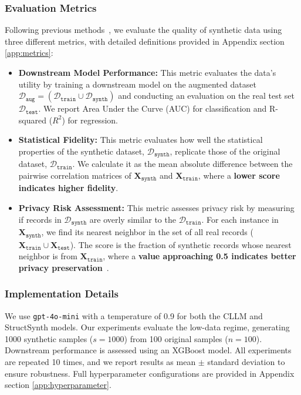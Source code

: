 \subsubsection{Evaluation Metrics}
Following previous methods~\cite{borisov2023language, cllm2024}, we evaluate the quality of synthetic data using three different metrics, with detailed definitions provided in Appendix section \ref{app:metrics}:
\begin{itemize}[leftmargin=*]
    \item \textbf{Downstream Model Performance:} This metric evaluates the data's utility by training a downstream model on the augmented dataset $\mathcal{D}_{\mathtt{aug}} = (\mathcal{D}_{\mathtt{train}} \cup \mathcal{D}_{\mathtt{synth}})$ and conducting an evaluation on the real test set $\mathcal{D}_{\mathtt{test}}$. We report Area Under the Curve (AUC) for classification and R-squared ($R^2$) for regression.

    \item \textbf{Statistical Fidelity:} This metric evaluates how well the statistical properties of the synthetic dataset, $\mathcal{D}_{\mathtt{synth}}$, replicate those of the original dataset, $\mathcal{D}_{\mathtt{train}}$. We calculate it as the mean absolute difference between the pairwise correlation matrices of $\mathbf{X}_{\mathtt{synth}}$ and $\mathbf{X}_{\mathtt{train}}$, where a \textbf{lower score indicates higher fidelity}.

    \item \textbf{Privacy Risk Assessment:} This metric assesses privacy risk by measuring if records in $\mathcal{D}_{\mathtt{synth}}$ are overly similar to the $\mathcal{D}_{\mathtt{train}}$. For each instance in $\mathbf{X}_{\mathtt{synth}}$, we find its nearest neighbor in the set of all real records ($\mathbf{X}_{\mathtt{train}} \cup \mathbf{X}_{\mathtt{test}}$). The score is the fraction of synthetic records whose nearest neighbor is from $\mathbf{X}_{\mathtt{train}}$, where a \textbf{value approaching 0.5 indicates better privacy preservation}~\cite{van2023membership}. 

\end{itemize}

\subsubsection{Implementation Details}

We use \texttt{gpt-4o-mini} with a temperature of 0.9 for both the CLLM and \textsf{StructSynth} models. Our experiments evaluate the low-data regime, generating 1000 synthetic samples ($s=1000$) from 100 original samples ($n=100$). Downstream performance is assessed using an XGBoost model. All experiments are repeated 10 times, and we report results as mean $\pm$ standard deviation to ensure robustness. Full hyperparameter configurations are provided in Appendix section \ref{app:hyperparameter}.


